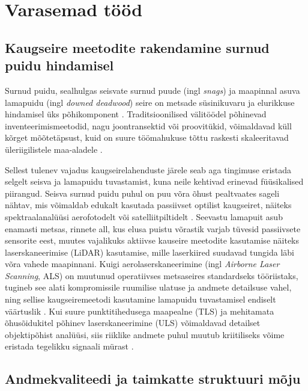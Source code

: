 \section{Varasemad tööd} \label{seotudtood}



\subsection{Kaugseire meetodite rakendamine surnud puidu hindamisel}



Surnud puidu, sealhulgas seisvate surnud puude (ingl \textit{snags}) ja maapinnal asuva lamapuidu (ingl \textit{downed deadwood}) seire on metsade süsinikuvaru ja elurikkuse hindamisel üks põhikomponent \parencite{marchi_airborne_2018, jarron_detection_2021}. 
Traditsioonilised välitöödel põhinevad inventeerimismeetodid, nagu joontransektid või proovitükid, võimaldavad küll kõrget mõõtetäpsust, kuid on suure töömahukuse tõttu raskesti skaleeritavad üleriigilistele maa-aladele \parencite{pesonen_airborne_2008, lopes_queiroz_estimating_2020}.

Sellest tulenev vajadus kaugseirelahenduste järele seab aga tingimuse eristada selgelt seisva ja lamapuidu tuvastamist, kuna neile kehtivad erinevad füüsikalised piirangud. Seisva surnud puidu puhul on puu võra õhust pealtvaates sageli nähtav, mis võimaldab edukalt kasutada passiivset optilist kaugseiret, näiteks spektraalanalüüsi aerofotodelt või satelliitpiltidelt \parencite{zielewska-buttner_detection_2020}. Seevastu lamapuit asub enamasti metsas, rinnete all, kus elusa puistu võrastik varjab tüvesid passiivsete sensorite eest, muutes vajalikuks aktiivse kauseire meetodite kasutamise näiteks laserskaneerimise (LiDAR) kasutamise, mille laserkiired suudavad tungida läbi võra vahede maapinnani. Kuigi aerolaserskaneerimine (ingl \textit{Airborne Laser Scanning}, ALS) on muutunud operatiivses metsaseires standardseks tööriistaks, tugineb see alati kompromissile ruumilise ulatuse ja andmete detailsuse vahel, ning sellise kaugseiremeetodi kasutamine lamapuidu tuvastamisel endiselt väärtuslik \parencite{marchi_airborne_2018}. Kui suure punktitihedusega maapealne (TLS) ja mehitamata õhusõidukitel põhinev laserskaneerimine (ULS) võimaldavad detailset objektipõhist analüüsi, siis riiklike andmete puhul muutub kriitiliseks võime eristada tegelikku signaali mürast \parencite{jarron_detection_2021, vakimies_makaavan_2025}.

\subsection{Andmekvaliteedi ja taimkatte struktuuri mõju}


